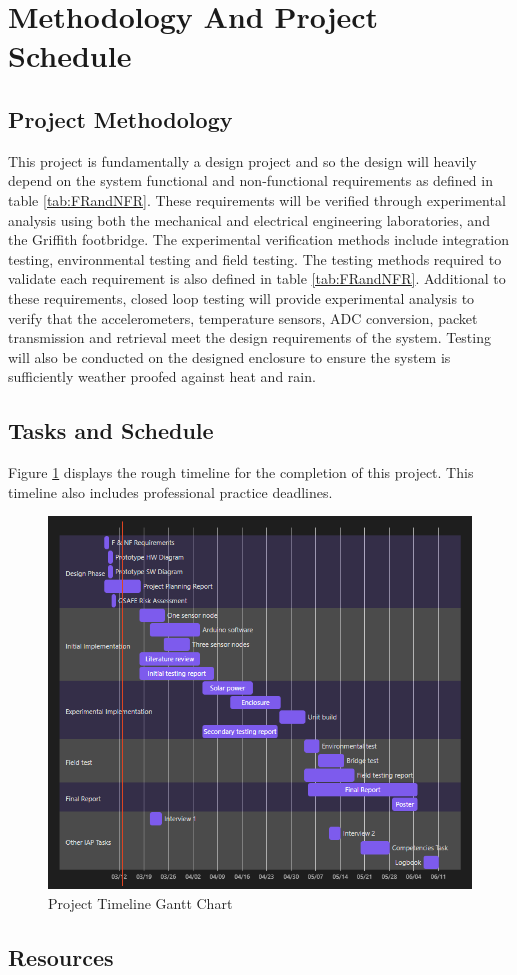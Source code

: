 \section{Methodology And Project Schedule}
\subsection{Project Methodology}
This project is fundamentally a design project and so the design will heavily depend on the system functional and non-functional requirements as defined in table \ref{tab:FRandNFR}. These requirements will be verified through experimental analysis using both the mechanical and electrical engineering laboratories, and the Griffith footbridge. The experimental verification methods include integration testing, environmental testing and field testing. The testing methods required to validate each requirement is also defined in table \ref{tab:FRandNFR}. Additional to these requirements, closed loop testing will provide experimental analysis to verify that the accelerometers, temperature sensors, ADC conversion, packet transmission and retrieval meet the design requirements of the system. Testing will also be conducted on the designed enclosure to ensure the system is sufficiently weather proofed against heat and rain.  

\subsection{Tasks and Schedule}
Figure \ref{fig:GanttChart} displays the rough timeline for the completion of this project. This timeline also includes professional practice deadlines. 

\begin{figure}[h!]
\center
\includegraphics[scale=0.8]{Images/Gantt-Chart.png}
\caption{Project Timeline Gantt Chart}
\label{fig:GanttChart}
\end{figure}

\subsection{Resources}




